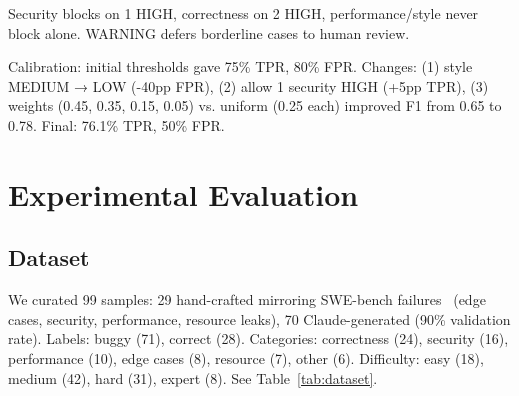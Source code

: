 \documentclass[10pt,twocolumn]{article}
\begin{document}
Security blocks on 1 HIGH, correctness on 2 HIGH, performance/style never block alone. WARNING defers borderline cases to human review.

Calibration: initial thresholds gave 75\% TPR, 80\% FPR. Changes: (1) style MEDIUM → LOW (-40pp FPR), (2) allow 1 security HIGH (+5pp TPR), (3) weights (0.45, 0.35, 0.15, 0.05) vs. uniform (0.25 each) improved F1 from 0.65 to 0.78. Final: 76.1\% TPR, 50\% FPR.


\section{Experimental Evaluation}

\subsection{Dataset}

We curated 99 samples: 29 hand-crafted mirroring SWE-bench failures~\cite{jimenez2024swebench, xia2025swebench} (edge cases, security, performance, resource leaks), 70 Claude-generated (90\% validation rate). Labels: buggy (71), correct (28). Categories: correctness (24), security (16), performance (10), edge cases (8), resource (7), other (6). Difficulty: easy (18), medium (42), hard (31), expert (8). See Table~\ref{tab:dataset}.
\end{document}
